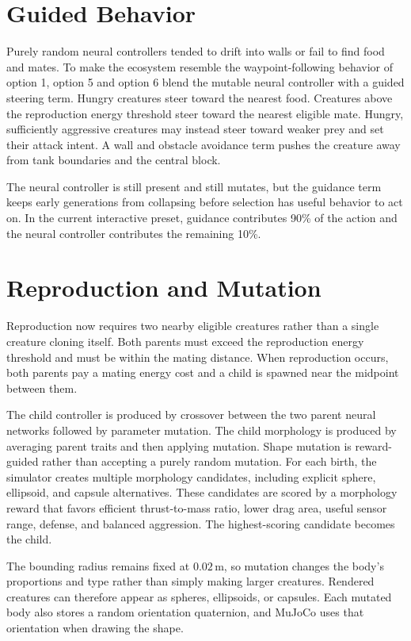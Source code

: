 \documentclass[12pt]{article}
\begin{document}
\section{Guided Behavior}

Purely random neural controllers tended to drift into walls or fail to find
food and mates.  To make the ecosystem resemble the waypoint-following behavior
of option 1, option 5 and option 6 blend the mutable neural controller with a
guided steering term.  Hungry creatures steer toward the nearest food.  Creatures
above the reproduction energy threshold steer toward the nearest eligible mate.
Hungry, sufficiently aggressive creatures may instead steer toward weaker prey
and set their attack intent.  A wall and obstacle avoidance term pushes the
creature away from tank boundaries and the central block.

The neural controller is still present and still mutates, but the guidance term
keeps early generations from collapsing before selection has useful behavior to
act on.  In the current interactive preset, guidance contributes 90\% of the
action and the neural controller contributes the remaining 10\%.

\section{Reproduction and Mutation}

Reproduction now requires two nearby eligible creatures rather than a single
creature cloning itself.  Both parents must exceed the reproduction energy
threshold and must be within the mating distance.  When reproduction occurs,
both parents pay a mating energy cost and a child is spawned near the midpoint
between them.

The child controller is produced by crossover between the two parent neural
networks followed by parameter mutation.  The child morphology is produced by
averaging parent traits and then applying mutation.  Shape mutation is
reward-guided rather than accepting a purely random mutation.  For each birth,
the simulator creates multiple morphology candidates, including explicit sphere,
ellipsoid, and capsule alternatives.  These candidates are scored by a
morphology reward that favors efficient thrust-to-mass ratio, lower drag area,
useful sensor range, defense, and balanced aggression.  The highest-scoring
candidate becomes the child.

The bounding radius remains fixed at \(0.02\,\mathrm{m}\), so mutation changes
the body's proportions and type rather than simply making larger creatures.
Rendered creatures can therefore appear as spheres, ellipsoids, or capsules.
Each mutated body also stores a random orientation quaternion, and MuJoCo uses
that orientation when drawing the shape.
\end{document}

